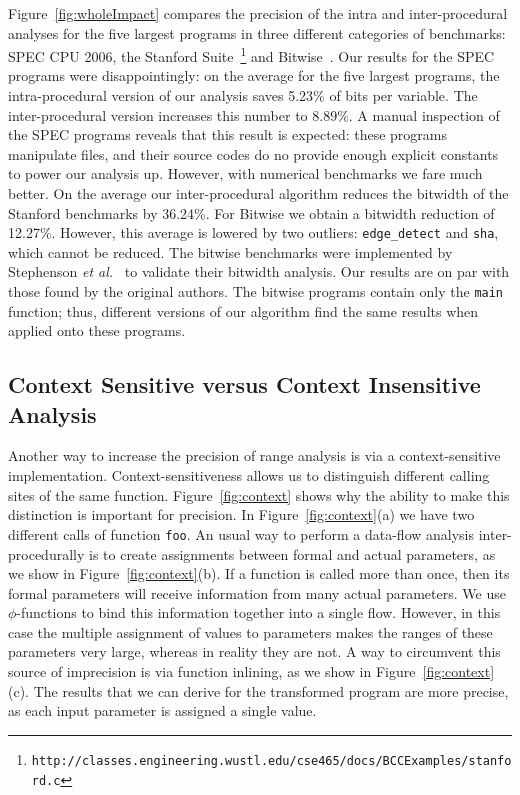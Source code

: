 \documentclass[times]{speauth}
\begin{document}
Figure~\ref{fig:wholeImpact} compares the precision of the intra and
inter-procedural analyses for the five largest programs in three different
categories of benchmarks: SPEC CPU 2006, the Stanford Suite~\footnote{\texttt{http://classes.engineering.wustl.edu/cse465/docs/BCCExamples/stanford.c}} and
Bitwise~\cite{Stephenson00}.
Our results for the SPEC programs were disappointingly: on the average for
the five largest programs, the intra-procedural version of our analysis saves
5.23\% of bits per variable.
The inter-procedural version increases this number to 8.89\%.
A manual inspection of the SPEC programs reveals that this result is expected:
these programs manipulate files, and their source codes do no provide enough
explicit constants to power our analysis up.
However, with numerical benchmarks we fare much better.
On the average our inter-procedural algorithm reduces the bitwidth of the
Stanford benchmarks by 36.24\%.
For Bitwise we obtain a bitwidth reduction of 12.27\%.
However, this average is lowered by two outliers: \texttt{edge\_detect} and
\texttt{sha}, which cannot be reduced.
The bitwise benchmarks were implemented by Stephenson
{\em et al.}~\cite{Stephenson00} to validate their bitwidth analysis.
Our results are on par with those found by the original authors.
The bitwise programs contain only the \texttt{main} function; thus, different
versions of our algorithm find the same results when applied onto these
programs.

\subsection{Context Sensitive versus Context Insensitive Analysis}
\label{sub:context}

Another way to increase the precision of range analysis is via a
context-sensitive implementation.
Context-sensitiveness allows us to distinguish different calling sites of
the same function.
Figure~\ref{fig:context} shows why the ability to make this distinction is
important for precision.
In Figure~\ref{fig:context}(a) we have two different calls of function
\texttt{foo}.
An usual way to perform a data-flow analysis inter-procedurally is to
create assignments between formal and actual parameters, as we show in
Figure~\ref{fig:context}(b).
If a function is called more than once, then its formal parameters will receive
information from many actual parameters.
We use $\phi$-functions to bind this information together into a single
flow.
However, in this case the multiple assignment of values to parameters
makes the ranges of these parameters very large, whereas in reality they
are not.
A way to circumvent this source of imprecision is via function inlining,
as we show in Figure~\ref{fig:context}(c).
The results that we can derive for the transformed program are more
precise, as each input parameter is assigned a single value.
\end{document}
